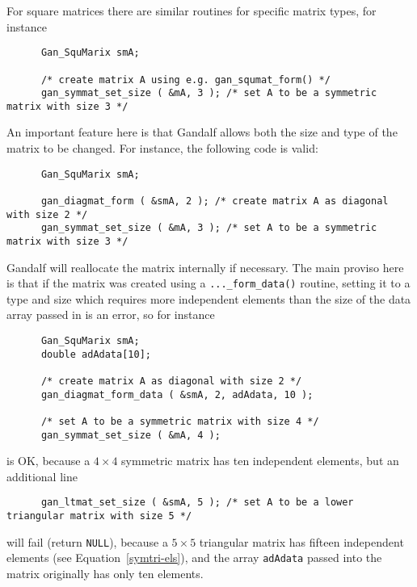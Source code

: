 For square matrices there are similar routines for specific matrix types,
for instance
\begin{verbatim}
      Gan_SquMarix smA;

      /* create matrix A using e.g. gan_squmat_form() */
      gan_symmat_set_size ( &mA, 3 ); /* set A to be a symmetric matrix with size 3 */
\end{verbatim}
An important feature here is that Gandalf allows both the size and type of
the matrix to be changed. For instance, the following code is valid:
\begin{verbatim}
      Gan_SquMarix smA;

      gan_diagmat_form ( &smA, 2 ); /* create matrix A as diagonal with size 2 */
      gan_symmat_set_size ( &mA, 3 ); /* set A to be a symmetric matrix with size 3 */
\end{verbatim}
Gandalf will reallocate the matrix internally if necessary. The main proviso
here is that if the matrix was created using a {\tt ...\_form\_data()} routine,
setting it to a type and size which requires more independent elements than
the size of the data array passed in is an error, so for instance
\begin{verbatim}
      Gan_SquMarix smA;
      double adAdata[10];

      /* create matrix A as diagonal with size 2 */
      gan_diagmat_form_data ( &smA, 2, adAdata, 10 );

      /* set A to be a symmetric matrix with size 4 */
      gan_symmat_set_size ( &mA, 4 );
\end{verbatim}
is OK, because a $4\times 4$ symmetric matrix has ten independent elements,
but an additional line
\begin{verbatim}
      gan_ltmat_set_size ( &smA, 5 ); /* set A to be a lower triangular matrix with size 5 */
\end{verbatim}
will fail (return {\tt NULL}), because a $5\times 5$ triangular matrix
has fifteen independent elements (see Equation~\ref{symtri-els}), and the
array {\tt adAdata} passed into the matrix originally has only ten elements.

